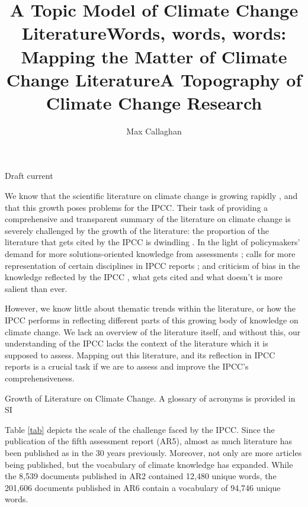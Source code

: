\documentclass{article}
\title{A Topic Model of Climate Change Literature}
\title{Words, words, words: Mapping the Matter of Climate Change Literature}
\title{A Topography of Climate Change Research}
\author[1,2]{Max Callaghan}
\affil[1]{Mercator Research Institute on Global Commons and Climate Change, Torgauer Straße, 10829 Berlin, Germany}
\affil[2]{School of Earth and Environment, University of Leeds, Leeds LS2 9JT, United Kingdom}
\makeatletter
\renewcommand{\maketitle}{\bgroup\setlength{\parindent}{0pt}
	\begin{flushleft}

		{\huge\textbf{\@title}}

		\bigskip

 		{\large\textbf{\@author}}

 		\bigskip

 		{\large{Draft current \@date}}

	\end{flushleft}\egroup
}
\makeatother
\begin{document}
\maketitle


\begin{linenumbers}

\noindent\textbf{}



\bigskip

\noindent We know that the scientific literature on climate change is growing rapidly \cite{Grieneisen2011, Haunschild2016}, and that this growth poses problems for the IPCC. Their task of providing a comprehensive and transparent summary of the literature on climate change is severely challenged by the growth of the literature: the proportion of the literature that gets cited by the IPCC is dwindling \cite{Minx2017l}. In the light of policymakers' demand for more solutions-oriented knowledge from assessments \cite{Kowarsch2017}; calls for more representation of certain disciplines in IPCC reports \cite{Victor2015, Barnes2013}; and criticism of bias in the knowledge reflected by the IPCC \cite{Bjurström2011, Hulme2010}, what gets cited and what doesn't is more salient than ever.

However, we know little about thematic trends within the literature, or how the IPCC performs in reflecting different parts of this growing body of knowledge on climate change. We lack an overview of the literature itself, and without this, our understanding of the IPCC \cite{} lacks the context of the literature which it is supposed to assess. Mapping out this literature, and its reflection in IPCC reports is a crucial task if we are to assess and improve the IPCC's comprehensiveness.

\begin{table}[htp]
	{\scriptsize
		}
	\caption{Growth of Literature on Climate Change. A glossary of acronyms is provided in SI}
	\label{tab}
\end{table}

Table \ref{tab} depicts the scale of the challenge faced by the IPCC. Since the publication of the fifth assessment report (AR5), almost as much literature has been published as in the 30 years previously. Moreover, not only are more articles being published, but the vocabulary of climate knowledge has expanded. While the 8,539 documents published in AR2 contained 12,480 unique words, the 201,606 documents published in AR6 contain a vocabulary of 94,746 unique words.


\end{linenumbers}
\end{document}
